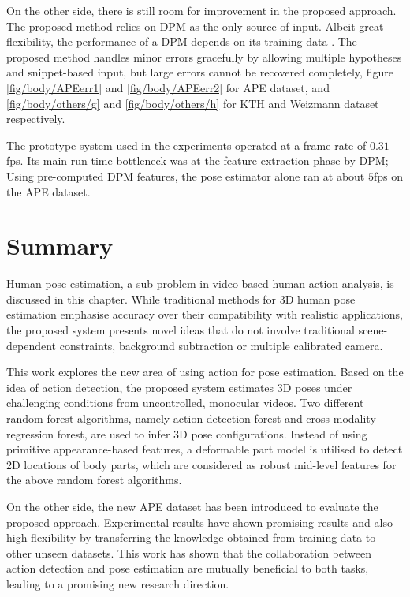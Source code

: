 On the other side, there is still room for improvement in the proposed approach. The proposed method relies on DPM as the only source of input. Albeit great flexibility, the performance of a DPM depends on its training data \cite{Yang2011, Eichner2012}. The proposed method handles minor errors gracefully by allowing multiple hypotheses and snippet-based input, but large errors cannot be recovered completely, \eg figure \ref{fig/body/APEerr1} and \ref{fig/body/APEerr2} for APE dataset, and \ref{fig/body/others/g} and \ref{fig/body/others/h} for KTH and Weizmann dataset respectively. 

The prototype system used in the experiments operated at a frame rate of $0.31$fps. Its main run-time bottleneck was at the feature extraction phase by DPM; Using pre-computed DPM features, the pose estimator alone ran at about $5$fps on the APE dataset. 



\section{Summary}
\label{sec/body/conclusions}

Human pose estimation, a sub-problem in video-based human action analysis, is discussed in this chapter.  
While traditional methods for 3D human pose estimation emphasise accuracy over their compatibility with realistic applications, the proposed system presents novel ideas that do not involve traditional scene-dependent constraints, \eg background subtraction or multiple calibrated camera.

This work explores the new area of using action for pose estimation. 
Based on the idea of action detection, the proposed system estimates 3D poses under challenging conditions from uncontrolled, monocular videos.
Two different random forest algorithms, namely action detection forest and cross-modality regression forest, are used to infer 3D pose configurations. Instead of using primitive appearance-based features, a deformable part model is utilised to detect 2D locations of body parts, which are considered as robust mid-level features for the above random forest algorithms.

On the other side, the new APE dataset has been introduced to evaluate the proposed approach.  
Experimental results have shown promising results and also high flexibility by transferring the knowledge obtained from training data to other unseen datasets. This work has shown that the collaboration between action detection and pose estimation are mutually beneficial to both tasks, leading to a promising new research direction.
